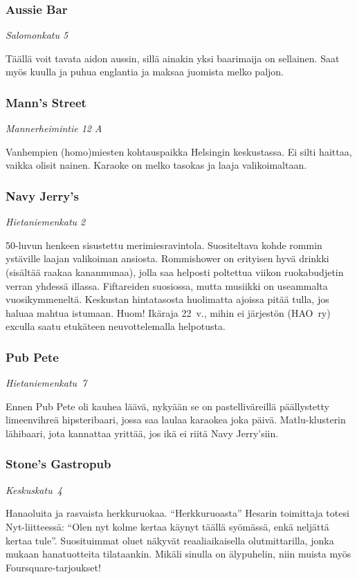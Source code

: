 \documentclass[../ala_hataile.tex]{subfiles}
\begin{document}
\subsubsection*{Aussie Bar}
\textit{Salomonkatu 5}

Täällä voit tavata aidon aussin, sillä
ainakin yksi baarimaija on sellainen. Saat
myös kuulla ja puhua englantia ja maksaa
juomista melko paljon.
\subsubsection*{Mann's Street}
\textit{Mannerheimintie 12 A}

Vanhempien (homo)miesten kohtauspaikka
Helsingin keskustassa. Ei silti haittaa,
vaikka olisit nainen. Karaoke on melko
tasokas ja laaja valikoimaltaan.
\subsubsection*{Navy Jerry's}
\textit{Hietaniemenkatu 2}

50-luvun henkeen sisustettu merimiesravintola.
Suositeltava kohde rommin ystäville laajan valikoiman ansiosta. Rommishower on erityisen hyvä drinkki (sisältää raakaa kananmunaa), jolla saa helposti poltettua viikon ruokabudjetin verran yhdessä illassa.
Fiftareiden suosiossa, mutta musiikki on
useammalta vuosikymmeneltä. Keskustan
hintatasosta huolimatta ajoissa pitää tulla,
jos haluaa mahtua istumaan. Huom! Ikäraja
22~v., mihin ei järjestön (HAO~ry) exculla
saatu etukäteen neuvottelemalla helpotusta.

\subsubsection*{Pub Pete}
\textit{Hietaniemenkatu~7}

Ennen Pub Pete oli kauhea läävä, nykyään se on pastelli\-väreillä päällystetty limeenvihreä hipsteribaari, jossa saa laulaa karaokea joka päivä. Matlu-klusterin lähibaari, jota kannattaa yrittää, jos ikä ei riitä Navy Jerry'siin.

\subsubsection*{Stone's Gastropub}
\textit{Keskuskatu~4}

Hanaoluita ja rasvaista herkkuruokaa.
``Herkkuruoasta'' Hesarin toimittaja totesi
Nyt-liitteessä: ``Olen nyt kolme kertaa
käynyt täällä syömässä, enkä neljättä kertaa
tule''. Suosituimmat oluet näkyvät reaaliaikaisella
olutmittarilla, jonka mukaan
hanatuotteita tilataankin. Mikäli sinulla on älypuhelin, niin muista myös Foursquare-tarjoukset!
\end{document}
